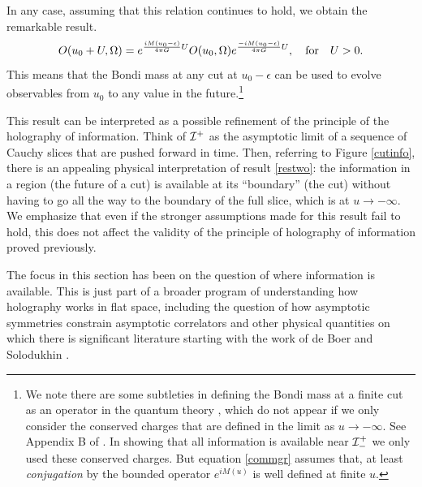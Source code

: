 \documentclass[12pt]{article}
\def\gnewt{G}
\newcommand{\be}{\begin{equation}}
\newcommand{\ee}{\end{equation}}
\def \sph{{\Omega}}
\def \scrip{{\cal I}^{+}}
\def \scrippast{{\cal I}^{+}_{-}}
\begin{document}
In any case, assuming that this relation continues to hold,  we obtain the remarkable result. 
\be
\label{restwo}
O(u_0 + U, \sph) = e^{{i M(u_0 - \epsilon) \over 4 \pi \gnewt}  U} O(u_0, \sph) e^{{-i M (u_0 - \epsilon) \over 4 \pi \gnewt} U}, ~~~\text{for}~~~ U> 0.
\ee
This means that the Bondi mass at any cut at $u_0 - \epsilon$ can be used to evolve observables from $u_0$ to any value in the future.\footnote{We note there are some subtleties in defining the Bondi mass at a finite cut as an operator in the quantum theory \cite{Bousso:2017xyo}, which do not appear if we only consider the conserved charges that are defined in the limit as $u \rightarrow -\infty$. See Appendix B of \cite{Laddha:2020kvp}.  In showing that all information is available near $\scrippast$ we only used these conserved charges.  But equation \eqref{commgr} assumes that, at least {\em conjugation} by the bounded operator $e^{i M(u)}$  is well defined at finite $u$.}




This result can be interpreted as a possible refinement of the principle of the holography of information.  Think of $\scrip$ as the asymptotic limit of a sequence of Cauchy slices that are pushed forward in time.  Then, referring to Figure \ref{cutinfo}, there is an appealing physical interpretation of result \ref{restwo}: the information in a region (the future of a cut) is available at its ``boundary'' (the cut) without having to go all the way to the boundary of the full slice, which is at $u \rightarrow -\infty$.  We emphasize that even if the stronger assumptions made for this result fail to hold, this does not affect the validity of the principle of holography of information proved previously.


The focus in this section has been on the question of where information is available. This is just part of a broader program of understanding how holography works in flat space, including the question of how asymptotic symmetries constrain asymptotic correlators and other physical quantities \cite{Bagchi:2012cy,Bagchi:2010eg,Bagchi:2014iea,Banerjee:2019prz,Pasterski:2016qvg,He:2017fsb,Mishra:2017zan} on which there is significant literature starting with the work of de Boer and Solodukhin \cite{deBoer:2003vf}.
\end{document}
